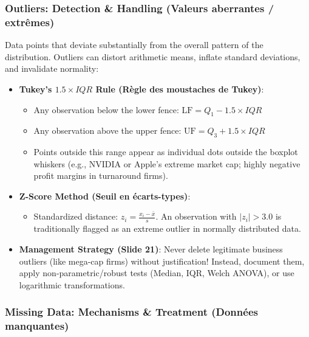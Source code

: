 \documentclass[
]{article}
\providecommand{\tightlist}{%
  \setlength{\itemsep}{0pt}\setlength{\parskip}{0pt}}
\begin{document}
\subsubsection{Outliers: Detection \& Handling (Valeurs aberrantes /
extrêmes)}\label{outliers-detection-handling-valeurs-aberrantes-extruxeames}

Data points that deviate substantially from the overall pattern of the
distribution. Outliers can distort arithmetic means, inflate standard
deviations, and invalidate normality:

\begin{itemize}
\tightlist
\item
  \textbf{Tukey's \(1.5 \times IQR\) Rule (Règle des moustaches de
  Tukey)}:

  \begin{itemize}
  \tightlist
  \item
    Any observation below the lower fence:
    \(\text{LF} = Q_1 - 1.5 \times IQR\)
  \item
    Any observation above the upper fence:
    \(\text{UF} = Q_3 + 1.5 \times IQR\)
  \item
    Points outside this range appear as individual dots outside the
    boxplot whiskers (e.g., NVIDIA or Apple's extreme market cap; highly
    negative profit margins in turnaround firms).
  \end{itemize}
\item
  \textbf{Z-Score Method (Seuil en écarts-types)}:

  \begin{itemize}
  \tightlist
  \item
    Standardized distance: \(z_i = \frac{x_i - \bar{x}}{s}\). An
    observation with \(|z_i| > 3.0\) is traditionally flagged as an
    extreme outlier in normally distributed data.
  \end{itemize}
\item
  \textbf{Management Strategy (Slide 21)}: Never delete legitimate
  business outliers (like mega-cap firms) without justification!
  Instead, document them, apply non-parametric/robust tests (Median,
  IQR, Welch ANOVA), or use logarithmic transformations.
\end{itemize}

\subsubsection{Missing Data: Mechanisms \& Treatment (Données
manquantes)}\label{missing-data-mechanisms-treatment-donnuxe9es-manquantes}
\end{document}
